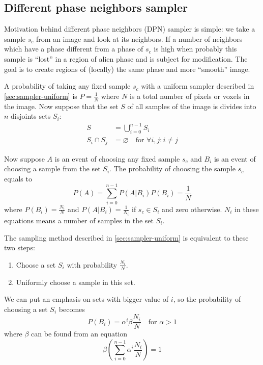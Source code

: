 \documentclass[preprint,amsmath,amssymb,aps,pre,nofootinbib]{revtex4-1}
\begin{document}
\subsection{Different phase neighbors sampler}
\label{sec:sampler-dpn}
Motivation behind different phase neighbors (DPN) sampler is simple: we take a
sample $s_c$ from an image and look at its neighbors. If a number of neighbors
which have a phase different from a phase of $s_c$ is high when probably this
sample is ``lost'' in a region of alien phase and is subject for
modification. The goal is to create regions of (locally) the same phase and more
``smooth'' image.

A probability of taking any fixed sample $s_c$ with a uniform sampler described
in \cref{sec:sampler-uniform} is $P = \frac{1}{N}$ where $N$ is a total number
of pixels or voxels in the image. Now suppose that the set $S$ of all samples of
the image is divides into $n$ disjoints sets $S_i$:
\begin{align*}
  S &= \bigcup_{i=0}^{n-1} S_i \\
  S_i \cap S_j &= \varnothing \quad \text{for } \forall i,j: i \ne j
\end{align*}

Now suppose $A$ is an event of choosing any fixed sample $s_c$ and $B_i$ is an
event of choosing a sample from the set $S_i$. The probability of choosing the
sample $s_c$ equals to
\begin{equation*}
  P(A) = \sum_{i = 0}^{n-1} P(A|B_i) P(B_i) = \frac{1}{N}
\end{equation*}
where $P(B_i) = \frac{N_i}{N}$ and $P(A|B_i) = \frac{1}{N_i}$ if $s_c \in S_i$
and zero otherwise. $N_i$ in these equations means a number of samples in the
set $S_i$.

The sampling method described in \cref{sec:sampler-uniform} is equivalent to
these two steps:
\begin{enumerate}
\item Choose a set $S_i$ with probability $\frac{N_i}{N}$.
\item Uniformly choose a sample in this set.
\end{enumerate}
We can put an emphasis on sets with bigger value of $i$, so the probability of
choosing a set $S_i$ becomes
\begin{equation}
  P(B_i) = \alpha^i \beta \frac{N_i}{N} \quad \text{for } \alpha > 1 \label{eq:prob-dpn}
\end{equation}
where $\beta$ can be found from an equation
\begin{equation*}
  \beta (\sum_{i=0}^{n-1} \alpha^i \frac{N_i}{N}) = 1
\end{equation*}
\end{document}
